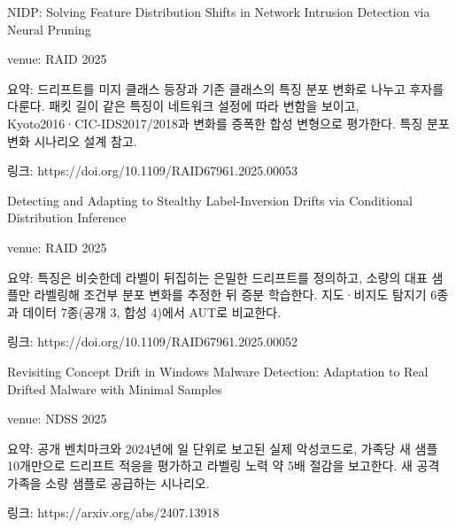 \par\noindent \textbullet\enspace NIDP: Solving Feature Distribution Shifts in Network Intrusion Detection via Neural Pruning


\par\noindent \textbullet\enspace venue: RAID 2025


\par\noindent \textbullet\enspace 요약: 드리프트를 미지 클래스 등장과 기존 클래스의 특징 분포 변화로 나누고 후자를 다룬다. 패킷 길이 같은 특징이 네트워크 설정에 따라 변함을 보이고, Kyoto2016·CIC-IDS2017/\allowbreak{}2018과 변화를 증폭한 합성 변형으로 평가한다. 특징 분포 변화 시나리오 설계 참고.


\par\noindent \textbullet\enspace 링크: https:/\allowbreak{}/\allowbreak{}doi.org/\allowbreak{}10.1109/\allowbreak{}RAID67961.2025.00053


\par\noindent \textbullet\enspace Detecting and Adapting to Stealthy Label-Inversion Drifts via Conditional Distribution Inference


\par\noindent \textbullet\enspace venue: RAID 2025


\par\noindent \textbullet\enspace 요약: 특징은 비슷한데 라벨이 뒤집히는 은밀한 드리프트를 정의하고, 소량의 대표 샘플만 라벨링해 조건부 분포 변화를 추정한 뒤 증분 학습한다. 지도·비지도 탐지기 6종과 데이터 7종(공개 3, 합성 4)에서 AUT로 비교한다.


\par\noindent \textbullet\enspace 링크: https:/\allowbreak{}/\allowbreak{}doi.org/\allowbreak{}10.1109/\allowbreak{}RAID67961.2025.00052


\par\noindent \textbullet\enspace Revisiting Concept Drift in Windows Malware Detection: Adaptation to Real Drifted Malware with Minimal Samples


\par\noindent \textbullet\enspace venue: NDSS 2025


\par\noindent \textbullet\enspace 요약: 공개 벤치마크와 2024년에 일 단위로 보고된 실제 악성코드로, 가족당 새 샘플 10개만으로 드리프트 적응을 평가하고 라벨링 노력 약 5배 절감을 보고한다. 새 공격 가족을 소량 샘플로 공급하는 시나리오.


\par\noindent \textbullet\enspace 링크: https:/\allowbreak{}/\allowbreak{}arxiv.org/\allowbreak{}abs/\allowbreak{}2407.13918


